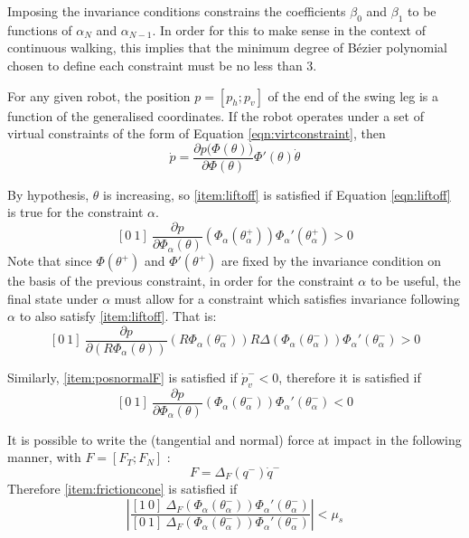Imposing the invariance conditions constrains the coefficients $\beta_0$ and $\beta_1$ to be functions of $\alpha_N$ and $\alpha_{N-1}$. In order for this to make sense in the context of continuous walking, this implies that the minimum degree of Bézier polynomial chosen to define each constraint must be no less than 3.

For any given robot, the position $p=[p_h;p_v]$ of the end of the swing leg is a function of the generalised coordinates. If the robot operates under a set of virtual constraints of the form of Equation \ref{eqn:virtconstraint}, then %
\begin{equation*}
	\dot{p} = \frac{\partial p\Big(\Phi(\theta)\Big)}{\partial\Phi(\theta)}
	\Phi'(\theta)\dot{\theta}
\end{equation*}

By hypothesis, $\theta$ is increasing, so \ref{item:liftoff} is satisfied if Equation \ref{eqn:liftoff} is true for the constraint $\alpha$.
\begin{equation} \label{eqn:liftoff}
	[0~1]~\frac{\partial p}{\partial\Phi_\alpha(\theta)}
	\left(\Phi_\alpha\left(\theta_\alpha^+\right)\right)\Phi_\alpha'\left(\theta_\alpha^+\right)>0
\end{equation}
Note that since $\Phi\left(\theta^+\right)$ and $\Phi'\left(\theta^+\right)$ are fixed by the invariance condition on the basis of the previous constraint, in order for the constraint $\alpha$ to be useful, the final state under $\alpha$ must allow for a constraint which satisfies invariance following $\alpha$ to also satisfy \ref{item:liftoff}. That is:
\begin{equation} \label{eqn:liftoffNext}
	[0~1]~\frac{\partial p}{\partial\left(R\Phi_\alpha(\theta)\right)}
	\left(R\Phi_\alpha\left(\theta_\alpha^-\right)\right)
	R\Delta\left(\Phi_\alpha\left(\theta_\alpha^-\right)\right)
	\Phi_\alpha'\left(\theta_\alpha^-\right)>0
\end{equation}

Similarly, \ref{item:posnormalF} is satisfied if $\dot{p}_v^- < 0$, therefore it is satisfied if
\begin{equation} \label{eqn:posnormalF}
	[0~1]~\frac{\partial p}{\partial\Phi_\alpha(\theta)}
	\left(\Phi_\alpha\left(\theta_\alpha^-\right)\right)\Phi_\alpha'\left(\theta_\alpha^-\right)<0
\end{equation}

It is possible to write the (tangential and normal) force at impact in the following manner, with $F = [F_T;F_N]$ \cite{westervelt2007feedback}:
\[ F = \Delta_{F}(q^-)\dot{q}^- \]
Therefore \ref{item:frictioncone} is satisfied if 
\begin{equation}
	\left\lvert\frac{[1~0]~\Delta_F(\Phi_\alpha\left(\theta_\alpha^-\right)) \Phi_\alpha'\left(\theta_\alpha^-\right)}
		{[0~1]~\Delta_F(\Phi_\alpha\left(\theta_\alpha^-\right)) \Phi_\alpha'\left(\theta_\alpha^-\right)}\right\rvert
		< \mu_s
\end{equation}
